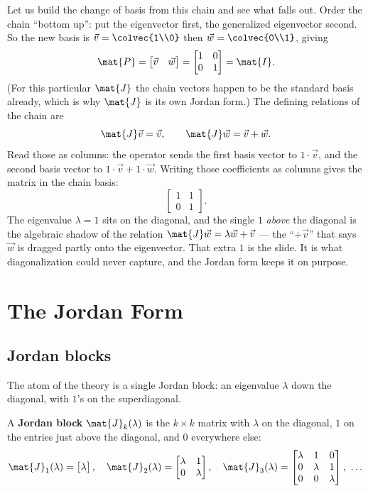 Let us build the change of basis from this chain and see what falls out. Order the chain
``bottom up'': put the eigenvector first, the generalized eigenvector second. So the new
basis is $\vec{v}=\colvec{1\\0}$ then $\vec{w}=\colvec{0\\1}$, giving
\[
\mat{P}=\begin{bmatrix}\vec{v}&\vec{w}\end{bmatrix}=\begin{bmatrix}1&0\\0&1\end{bmatrix}=\mat{I}.
\]
(For this particular $\mat{J}$ the chain vectors happen to be the standard basis already,
which is why $\mat{J}$ is its own Jordan form.) The defining relations of the chain are
\[
\mat{J}\vec{v}=\vec{v},\qquad \mat{J}\vec{w}=\vec{v}+\vec{w}.
\]
Read those as columns: the operator sends the first basis vector to $1\cdot\vec{v}$, and
the second basis vector to $1\cdot\vec{v}+1\cdot\vec{w}$. Writing those coefficients as
columns gives the matrix in the chain basis:
\[
\begin{bmatrix}1&1\\0&1\end{bmatrix}.
\]
The eigenvalue $\lambda=1$ sits on the diagonal, and the single $1$ \emph{above} the
diagonal is the algebraic shadow of the relation $\mat{J}\vec{w}=\lambda\vec{w}+\vec{v}$
--- the ``$+\vec{v}$'' that says $\vec{w}$ is dragged partly onto the eigenvector. That
extra $1$ is the slide. It is what diagonalization could never capture, and the Jordan
form keeps it on purpose.

\section{The Jordan Form}
\label{ch28:jordan}

\subsection{Jordan blocks}

The atom of the theory is a single Jordan block: an eigenvalue $\lambda$ down the
diagonal, with $1$'s on the superdiagonal.

\begin{definition}
\label{ch28:def-block}
A \textbf{Jordan block} $\mat{J}_k(\lambda)$ is the $k\times k$ matrix with $\lambda$ on
the diagonal, $1$ on the entries just above the diagonal, and $0$ everywhere else:
\[
\mat{J}_1(\lambda)=\begin{bmatrix}\lambda\end{bmatrix},\quad
\mat{J}_2(\lambda)=\begin{bmatrix}\lambda&1\\0&\lambda\end{bmatrix},\quad
\mat{J}_3(\lambda)=\begin{bmatrix}\lambda&1&0\\0&\lambda&1\\0&0&\lambda\end{bmatrix},\ \dots
\]
\end{definition}

